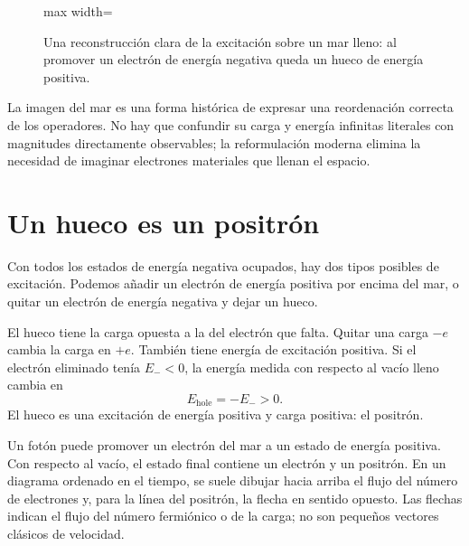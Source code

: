 \begin{figure}[htbp]
\centering
\begin{adjustbox}{max width=\linewidth}
\end{adjustbox}
\caption{Una reconstrucción clara de la excitación sobre un mar lleno: al promover un electrón de energía negativa queda un hueco de energía positiva.}
\end{figure}

La imagen del mar es una forma histórica de expresar una reordenación correcta de los operadores. No hay que confundir su carga y energía infinitas literales con magnitudes directamente observables; la reformulación moderna elimina la necesidad de imaginar electrones materiales que llenan el espacio.

\section{Un hueco es un positrón}

Con todos los estados de energía negativa ocupados, hay dos tipos posibles de excitación. Podemos añadir un electrón de energía positiva por encima del mar, o quitar un electrón de energía negativa y dejar un hueco.

El hueco tiene la carga opuesta a la del electrón que falta. Quitar una carga \(-e\) cambia la carga en \(+e\). También tiene energía de excitación positiva. Si el electrón eliminado tenía \(E_-<0\), la energía medida con respecto al vacío lleno cambia en
\begin{equation}
E_{\mathrm{hole}}=-E_->0.
\end{equation}
El hueco es una excitación de energía positiva y carga positiva: el positrón.

Un fotón puede promover un electrón del mar a un estado de energía positiva. Con respecto al vacío, el estado final contiene un electrón y un positrón. En un diagrama ordenado en el tiempo, se suele dibujar hacia arriba el flujo del número de electrones y, para la línea del positrón, la flecha en sentido opuesto. Las flechas indican el flujo del número fermiónico o de la carga; no son pequeños vectores clásicos de velocidad.

